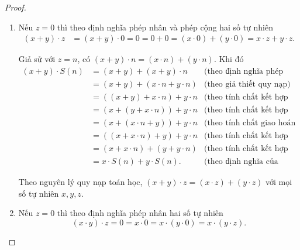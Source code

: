 \begin{proof}
    \begin{enumerate}[label={(\roman*)}]
        \item Nếu $z = 0$ thì theo định nghĩa phép nhân và phép cộng hai số tự nhiên
              \begin{align*}
                  (x + y)\cdot z & = (x + y)\cdot 0 = 0 = 0 + 0 = (x\cdot 0) + (y\cdot 0) = x\cdot z + y\cdot z.
              \end{align*}

              Giả sử với $z = n$, có $(x + y)\cdot n = (x\cdot n) + (y\cdot n)$. Khi đó
              \begin{align*}
                  (x + y)\cdot S(n) & = (x + y) + (x + y)\cdot n        & \text{(theo định nghĩa phép nhân số tự nhiên)}              \\
                                    & = (x + y) + (x\cdot n + y\cdot n) & \text{(theo giả thiết quy nạp)}                             \\
                                    & = ((x + y) + x\cdot n) + y\cdot n & \text{(theo tính chất kết hợp của phép cộng số tự nhiên)}   \\
                                    & = (x + (y + x\cdot n)) + y\cdot n & \text{(theo tính chất kết hợp của phép cộng số tự nhiên)}   \\
                                    & = (x + (x\cdot n + y)) + y\cdot n & \text{(theo tính chất giao hoán của phép cộng số tự nhiên)} \\
                                    & = ((x + x\cdot n) + y) + y\cdot n & \text{(theo tính chất kết hợp của phép cộng số tự nhiên)}   \\
                                    & = (x + x\cdot n) + (y + y\cdot n) & \text{(theo tính chất kết hợp của phép cộng số tự nhiên)}   \\
                                    & = x\cdot S(n) + y\cdot S(n).      & \text{(theo định nghĩa của phép nhân số tự nhiên)}
              \end{align*}

              Theo nguyên lý quy nạp toán học, $(x + y)\cdot z = (x\cdot z) + (y\cdot z)$ với mọi số tự nhiên $x, y, z$.
        \item Nếu $z = 0$ thì theo định nghĩa phép nhân hai số tự nhiên
              \[
                  (x\cdot y)\cdot z = 0 = x\cdot 0 = x\cdot (y\cdot 0) = x\cdot (y\cdot z).
              \]


\end{enumerate}
\end{proof}
